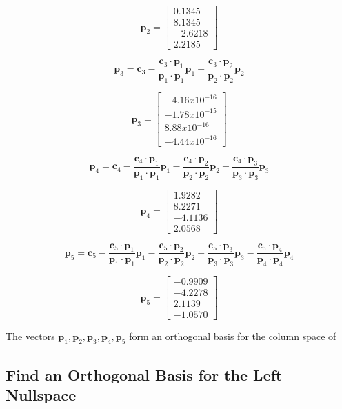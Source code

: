 \documentclass{article}
\begin{document}
\[
\mathbf{p}_2 = \begin{bmatrix} 0.1345 \\ 8.1345 \\ -2.6218 \\ 2.2185 \end{bmatrix}
\]

\[
\mathbf{p}_3 = \mathbf{c}_3 - \frac{\mathbf{c}_3 \cdot \mathbf{p}_1}{\mathbf{p}_1 \cdot \mathbf{p}_1} \mathbf{p}_1 - \frac{\mathbf{c}_3 \cdot \mathbf{p}_2}{\mathbf{p}_2 \cdot \mathbf{p}_2} \mathbf{p}_2
\]

\[
\mathbf{p}_3 = \begin{bmatrix} -4.16x10^{-16} \\ -1.78x10^{-15} \\ 8.88x10^{-16} \\ -4.44x10^{-16} \end{bmatrix}
\]

\[
\mathbf{p}_4 = \mathbf{c}_4 - \frac{\mathbf{c}_4 \cdot \mathbf{p}_1}{\mathbf{p}_1 \cdot \mathbf{p}_1} \mathbf{p}_1 - \frac{\mathbf{c}_4 \cdot \mathbf{p}_2}{\mathbf{p}_2 \cdot \mathbf{p}_2} \mathbf{p}_2 - \frac{\mathbf{c}_4 \cdot \mathbf{p}_3}{\mathbf{p}_3 \cdot \mathbf{p}_3} \mathbf{p}_3
\]

\[
\mathbf{p}_4 = \begin{bmatrix} 1.9282 \\ 8.2271 \\ -4.1136 \\ 2.0568 \end{bmatrix}
\]

\[
\mathbf{p}_5 = \mathbf{c}_5 - \frac{\mathbf{c}_5 \cdot \mathbf{p}_1}{\mathbf{p}_1 \cdot \mathbf{p}_1} \mathbf{p}_1 - \frac{\mathbf{c}_5 \cdot \mathbf{p}_2}{\mathbf{p}_2 \cdot \mathbf{p}_2} \mathbf{p}_2 - \frac{\mathbf{c}_5 \cdot \mathbf{p}_3}{\mathbf{p}_3 \cdot \mathbf{p}_3} \mathbf{p}_3 - \frac{\mathbf{c}_5 \cdot \mathbf{p}_4}{\mathbf{p}_4 \cdot \mathbf{p}_4} \mathbf{p}_4
\]

\[
\mathbf{p}_5 = \begin{bmatrix} -0.9909 \\ -4.2278 \\ 2.1139 \\ -1.0570 \end{bmatrix}
\]

The vectors \( \mathbf{p}_1, \mathbf{p}_2, \mathbf{p}_3, \mathbf{p}_4, \mathbf{p}_5 \) form an orthogonal basis for the column space of

\subsection{Find an Orthogonal Basis for the Left Nullspace}
\end{document}
